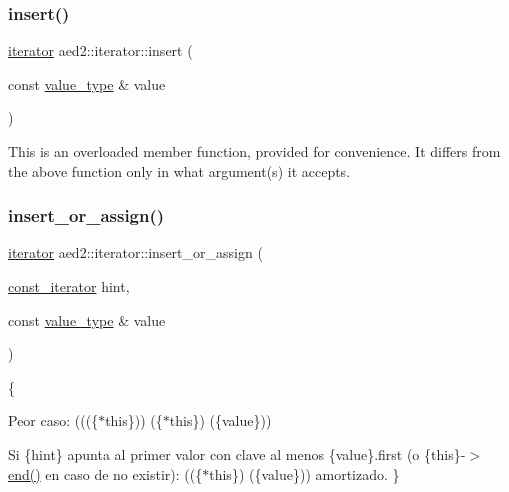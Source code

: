 \subsubsection{\texorpdfstring{insert()}{insert()}\hspace{0.1cm}{\footnotesize\ttfamily [2/2]}}
{\footnotesize\ttfamily \hyperlink{classaed2_1_1iterator_1_1iterator}{iterator} aed2\+::iterator\+::insert (\begin{DoxyParamCaption}\item[{const \hyperlink{classaed2_1_1iterator_a6411a2c08b2b7c52f063bef1a168acb6}{value\+\_\+type} \&}]{value }\end{DoxyParamCaption})\hspace{0.3cm}{\ttfamily [inline]}}

This is an overloaded member function, provided for convenience. It differs from the above function only in what argument(s) it accepts. \mbox{\label{classaed2_1_1iterator_aab34e7001b3ee3ce79da8ea24d7e6351}} 
\subsubsection{\texorpdfstring{insert\+\_\+or\+\_\+assign()}{insert\_or\_assign()}\hspace{0.1cm}{\footnotesize\ttfamily [1/2]}}
{\footnotesize\ttfamily \hyperlink{classaed2_1_1iterator_1_1iterator}{iterator} aed2\+::iterator\+::insert\+\_\+or\+\_\+assign (\begin{DoxyParamCaption}\item[{\hyperlink{classaed2_1_1iterator_1_1const__iterator}{const\+\_\+iterator}}]{hint,  }\item[{const \hyperlink{classaed2_1_1iterator_a6411a2c08b2b7c52f063bef1a168acb6}{value\+\_\+type} \&}]{value }\end{DoxyParamCaption})\hspace{0.3cm}{\ttfamily [inline]}}

\{
\begin{DoxyItemize}
\item Peor caso\+: (((\{$\ast$this\}))  (\{$\ast$this\})  (\{value\}))
\item Si \{hint\} apunta al primer valor con clave al menos \{value\}.first (o \{this\}-\/$>$\hyperlink{classaed2_1_1iterator_a67caf9468be999e9be96b7add5d79946}{end()} en caso de no existir)\+: ((\{$\ast$this\})  (\{value\})) amortizado. \}
\end{DoxyItemize}

